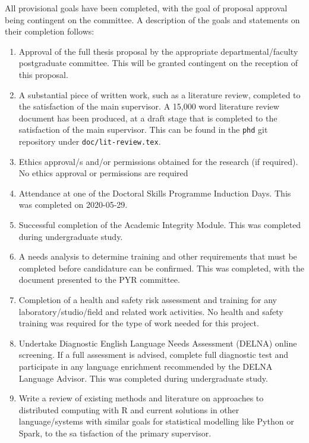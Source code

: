 All provisional goals have been completed, with the goal of proposal approval being contingent on the committee.
A description of the goals and statements on their completion follows:

\begin{enumerate}
        \item Approval of the full thesis proposal by the appropriate departmental/faculty postgraduate committee.
                This will be granted contingent on the reception of this proposal.
        \item A substantial piece of written work, such as a literature review, completed to the satisfaction of the main supervisor.
                A 15,000 word literature review document has been produced, at a draft stage that is completed to the satisfaction of the main supervisor.
                This can be found in the \texttt{phd} git repository under \texttt{doc/lit-review.tex}.
        \item Ethics approval/s and/or permissions obtained for the research (if required).
                No ethics approval or permissions are required
        \item Attendance at one of the Doctoral Skills Programme Induction Days.
                This was completed on 2020-05-29.
        \item Successful completion of the Academic Integrity Module.
                This was completed during undergraduate study.
        \item A needs analysis to determine training and other requirements that must be completed before candidature can be confirmed.
                This was completed, with the document presented to the PYR committee.
        \item Completion of a health and safety risk assessment and training for any laboratory/studio/field and related work activities.
                No health and safety training was required for the type of work needed for this project.
        \item Undertake Diagnostic English Language Needs Assessment (DELNA) online screening.
                If a full assessment is advised, complete full diagnostic test and participate in any language enrichment recommended by the DELNA Language Advisor.
                This was completed during undergraduate study.
        \item Write a review of existing methods and literature on approaches to distributed computing with R and current solutions in other language/systems with similar goals for statistical modelling like Python or Spark, to the sa    tisfaction of the primary supervisor.

\end{enumerate}
